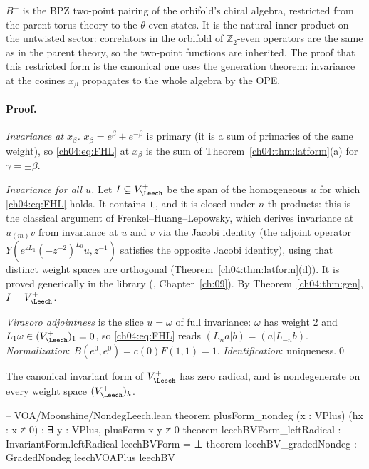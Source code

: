 \begin{physics}
$B^+$ is the BPZ two-point pairing of the orbifold's chiral algebra, restricted from the parent torus theory to the $\theta$-even states. It is the natural inner product on the untwisted sector: correlators in the orbifold of $\mathbb Z_2$-even operators are the same as in the parent theory, so the two-point functions are inherited. The proof that this restricted form is the canonical one uses the generation theorem: invariance at the cosines $x_\beta$ propagates to the whole algebra by the OPE.
\end{physics}

\paragraph{Proof.} \emph{Invariance at $x_\beta$.} $x_\beta=e^\beta+e^{-\beta}$ is primary (it is a sum
of primaries of the same weight), so \eqref{ch04:eq:FHL} at $x_\beta$ is the sum of
Theorem~\ref{ch04:thm:latform}(a) for $\gamma=\pm\beta$.

\emph{Invariance for all $u$.} Let $I\subseteq V_\Leech^+$ be the span of the homogeneous $u$ for which
\eqref{ch04:eq:FHL} holds. It contains $\mathbf{1}$, and it is closed under $n$-th products: this is
the classical argument of Frenkel--Huang--Lepowsky, which derives invariance at $u_{(m)}v$ from
invariance at $u$ and $v$ via the Jacobi identity (the adjoint operator $Y(e^{zL_1}(-z^{-2})^{L_0}u,z^{-1})$
satisfies the opposite Jacobi identity), using that distinct weight spaces are orthogonal
(Theorem~\ref{ch04:thm:latform}(d)). It is proved generically in the library
(, Chapter~\ref{ch:09}). By Theorem~\ref{ch04:thm:gen}, $I=V_\Leech^+$.

\emph{Virasoro adjointness} is the slice $u=\omega$ of full invariance: $\omega$ has weight $2$ and
$L_1\omega\in(V_\Leech^+)_1=0$, so \eqref{ch04:eq:FHL} reads $(L_na|b)=(a|L_{-n}b)$.
\emph{Normalization}: $B(e^0,e^0)=c(0)F(1,1)=1$. \emph{Identification}: uniqueness.\qed

\begin{theorem}\label{ch04:thm:hnd}
The canonical invariant form of $V_\Leech^+$ has zero radical, and is nondegenerate on every weight
space $(V_\Leech^+)_k$.
\end{theorem}

\begin{leancode}
-- VOA/Moonshine/NondegLeech.lean
theorem plusForm_nondeg (x : VPlus) (hx : x ≠ 0) : ∃ y : VPlus, plusForm x y ≠ 0
theorem leechBVForm_leftRadical : InvariantForm.leftRadical leechBVForm = ⊥
theorem leechBV_gradedNondeg : GradedNondeg leechVOAPlus leechBV
\end{leancode}

